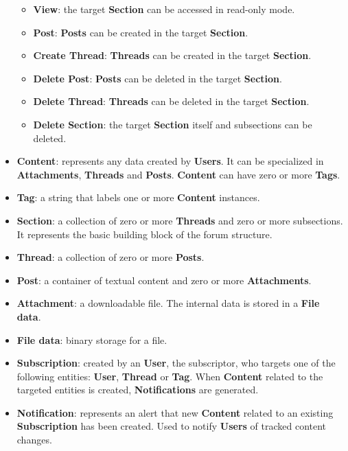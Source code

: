\documentclass[12pt]{report}
\renewcommand\emph{\textbf}
\begin{document}
\begin{itemize}
                        \begin{itemize}
                            \item \emph{View}: the target \emph{Section} can be accessed in read-only mode.                        
                            \item \emph{Post}: \emph{Posts} can be created in the target \emph{Section}.
                            \item \emph{Create Thread}: \emph{Threads} can be created in the target \emph{Section}.
                            \item \emph{Delete Post}: \emph{Posts} can be deleted in the target \emph{Section}.
                            \item \emph{Delete Thread}: \emph{Threads} can be deleted in the target \emph{Section}.
                            \item \emph{Delete Section}: the target \emph{Section} itself and subsections can be deleted.
                        \end{itemize}

                    \item \emph{Content}: represents any data created by \emph{Users}. It can be specialized in \emph{Attachments}, \emph{Threads} and \emph{Posts}. \emph{Content} can have zero or more \emph{Tags}.
                    \item \emph{Tag}: a string that labels one or more \emph{Content} instances.
                    \item \emph{Section}: a collection of zero or more \emph{Threads} and zero or more subsections. It represents the basic building block of the forum structure.
                    \item \emph{Thread}: a collection of zero or more \emph{Posts}. 
                    \item \emph{Post}: a container of textual content and zero or more \emph{Attachments}.
                    \item \emph{Attachment}: a downloadable file. The internal data is stored in a \emph{File data}.
                    \item \emph{File data}: binary storage for a file. 
                    \item \emph{Subscription}: created by an \emph{User}, the subscriptor, who targets one of the following entities: \emph{User}, \emph{Thread} or \emph{Tag}. When \emph{Content} related to the targeted entities is created, \emph{Notifications} are generated.
                    \item \emph{Notification}: represents an alert that new \emph{Content} related to an existing \emph{Subscription} has been created. Used to notify \emph{Users} of tracked content changes.
                \end{itemize}
\end{document}
